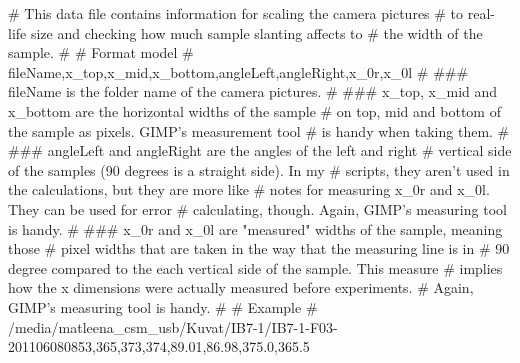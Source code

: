 # This data file contains information for scaling the camera pictures
# to real-life size and checking how much sample slanting affects to
# the width of the sample.
#
# Format model
# fileName,x_top,x_mid,x_bottom,angleLeft,angleRight,x_0r,x_0l
#
### fileName is the folder name of the camera pictures.
#
### x_top, x_mid and x_bottom are the horizontal widths of the sample
# on top, mid and bottom of the sample as pixels. GIMP's measurement tool
# is handy when taking them.
#
### angleLeft and angleRight are the angles of the left and right
# vertical side of the samples (90 degrees is a straight side). In my
# scripts, they aren't used in the calculations, but they are more like
# notes for measuring x_0r and x_0l. They can be used for error
# calculating, though. Again, GIMP's measuring tool is handy.
#
### x_0r and x_0l are "measured" widths of the sample, meaning those
# pixel widths that are taken in the way that the measuring line is in
# 90 degree compared to the each vertical side of the sample. This measure
# implies how the x dimensions were actually measured before experiments.
# Again, GIMP's measuring tool is handy.
#
# Example
#
/media/matleena_csm_usb/Kuvat/IB7-1/IB7-1-F03-201106080853,365,373,374,89.01,86.98,375.0,365.5
